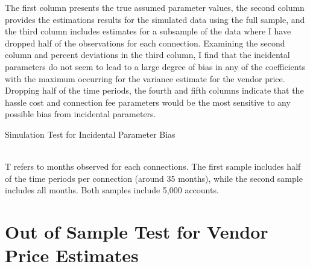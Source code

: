\documentclass[12pt]{article}
\begin{document}
\begin{appendices}
The first column presents the true assumed parameter values, the second column provides the estimations results for the simulated data using the full sample, and the third column includes estimates for a subsample of the data where I have dropped half of the observations for each connection.  Examining the second column and percent deviations in the third column, I find that the incidental parameters do not seem to lead to a large degree of bias in any of the coefficients with the maximum occurring for the variance estimate for the vendor price.  Dropping half of the time periods, the fourth and fifth columns indicate that the hassle cost and connection fee parameters would be the most sensitive to any possible bias from incidental parameters.

\begin{table}

\centering
\caption{Simulation Test for Incidental Parameter Bias}\label{table:incidentalparameters}
\\
\footnotesize{T refers to months observed for each connections.  The first sample includes half of the time periods per connection (around 35 months), while the second sample includes all months.  Both samples include 5,000 accounts.}
\end{table}



\section{Out of Sample Test for Vendor Price Estimates}\label{appendix:vendorpriceestimates}





\end{appendices}
\end{document}
